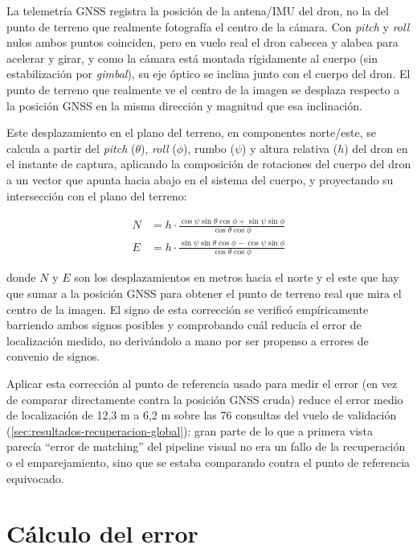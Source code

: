 La telemetría GNSS registra la posición de la antena/IMU del dron, no la del punto de terreno que realmente fotografía el centro de la cámara. Con \textit{pitch} y \textit{roll} nulos ambos puntos coinciden, pero en vuelo real el dron cabecea y alabea para acelerar y girar, y como la cámara está montada rígidamente al cuerpo (sin estabilización por \textit{gimbal}), su eje óptico se inclina junto con el cuerpo del dron. El punto de terreno que realmente ve el centro de la imagen se desplaza respecto a la posición GNSS en la misma dirección y magnitud que esa inclinación.

Este desplazamiento en el plano del terreno, en componentes norte/este, se calcula a partir del \textit{pitch} ($\theta$), \textit{roll} ($\phi$), rumbo ($\psi$) y altura relativa ($h$) del dron en el instante de captura, aplicando la composición de rotaciones del cuerpo del dron a un vector que apunta hacia abajo en el sistema del cuerpo, y proyectando su intersección con el plano del terreno:

\begin{equation}
\begin{aligned}
N &= h \cdot \frac{\cos\psi \sin\theta \cos\phi + \sin\psi \sin\phi}{\cos\theta \cos\phi} \\
E &= h \cdot \frac{\sin\psi \sin\theta \cos\phi - \cos\psi \sin\phi}{\cos\theta \cos\phi}
\end{aligned}
\label{eq:nadir-offset}
\end{equation}

\noindent donde $N$ y $E$ son los desplazamientos en metros hacia el norte y el este que hay que sumar a la posición GNSS para obtener el punto de terreno real que mira el centro de la imagen. El signo de esta corrección se verificó empíricamente barriendo ambos signos posibles y comprobando cuál reducía el error de localización medido, no derivándolo a mano por ser propenso a errores de convenio de signos.

Aplicar esta corrección al punto de referencia usado para medir el error (en vez de comparar directamente contra la posición GNSS cruda) reduce el error medio de localización de 12,3 m a 6,2 m sobre las 76 consultas del vuelo de validación (\autoref{sec:resultados-recuperacion-global}): gran parte de lo que a primera vista parecía \enquote{error de matching} del pipeline visual no era un fallo de la recuperación o el emparejamiento, sino que se estaba comparando contra el punto de referencia equivocado.

\section{Cálculo del error}
\label{sec:calculo-error}

